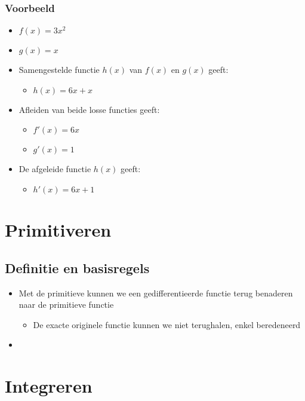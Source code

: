 \documentclass[11pt]{article}
\begin{document}
\subsubsection{Voorbeeld}
\label{sec:org219ae31}
\begin{itemize}
\item \(f(x) = 3x^{2}\)
\item \(g(x) = x\)
\item Samengestelde functie \(h(x)\) van \(f(x)\) en \(g(x)\) geeft:
\begin{itemize}
\item \(h(x) = 6x+x\)
\end{itemize}
\item Afleiden van beide losse functies geeft:
\begin{itemize}
\item \(f'(x) = 6x\)
\item \(g'(x) = 1\)
\end{itemize}
\item De afgeleide functie \(h(x)\) geeft:
\begin{itemize}
\item \(h'(x) = 6x+1\)
\end{itemize}
\end{itemize}


\section{Primitiveren}
\label{sec:org31c8cf1}

\subsection{Definitie en basisregels}
\label{sec:org6a2cb5f}
\begin{itemize}
\item Met de primitieve kunnen we een gedifferentieerde functie terug benaderen naar de primitieve functie
\begin{itemize}
\item De exacte originele functie kunnen we niet terughalen, enkel beredeneerd
\end{itemize}
\item 
\end{itemize}


\section{Integreren}
\label{sec:org75c7b4e}
\end{document}
